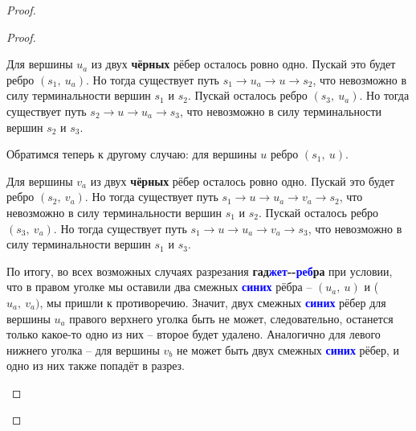 \documentclass[a4paper,12pt]{article}
\begin{document}
\begin{proof}
\begin{proof}
\begin{itemize}
\begin{center}
\begin{tikzpicture}
            \end{tikzpicture}
            \end{center}
            Для вершины $u_a$ из двух \textbf{чёрных} рёбер осталось ровно одно. Пускай это будет ребро $(s_1,\ u_a)$. Но тогда существует путь $s_1 \to u_a \to u \to s_2$, что невозможно в силу терминальности вершин $s_1$ и $s_2$. Пускай осталось ребро $(s_3,\ u_a)$. Но тогда существует путь $s_2 \to u \to u_a \to s_3$, что невозможно в силу терминальности вершин $s_2$ и $s_3$.
            
            Обратимся теперь к другому случаю: для вершины $u$ ребро $(s_1,\ u)$.
            \begin{center}
            \end{center}
            Для вершины $v_a$ из двух \textbf{чёрных} рёбер осталось ровно одно. Пускай это будет ребро $(s_2,\ v_a)$. Но тогда существует путь $s_1 \to u \to u_a \to v_a \to s_2$, что невозможно в силу терминальности вершин $s_1$ и $s_2$. Пускай осталось ребро $(s_3,\ v_a)$. Но тогда существует путь $s_1 \to u \to u_a \to v_a \to s_3$, что невозможно в силу терминальности вершин $s_1$ и $s_3$.
            
            По итогу, во всех возможных случаях разрезания \textbf{гад}\textbf{\textcolor{blue}{жет}}\textbf{-}\textbf{-}\textbf{\textcolor{blue}{реб}}\textbf{ра} при условии, что в правом уголке мы оставили два смежных \textbf{\textcolor{blue}{синих}} рёбра -- $(u_a,\ u)$ и ($u_a,\ v_a)$, мы пришли к противоречию. Значит, двух смежных \textbf{\textcolor{blue}{синих}} рёбер для вершины $u_a$ правого верхнего  уголка быть не может, следовательно, останется только какое-то одно из них -- второе будет удалено. Аналогично для левого нижнего уголка -- для вершины $v_b$ не может быть двух смежных \textbf{\textcolor{blue}{синих}} рёбер, и одно из них также попадёт в разрез. 
            

\end{itemize}
\end{proof}
\end{proof}
\end{document}
